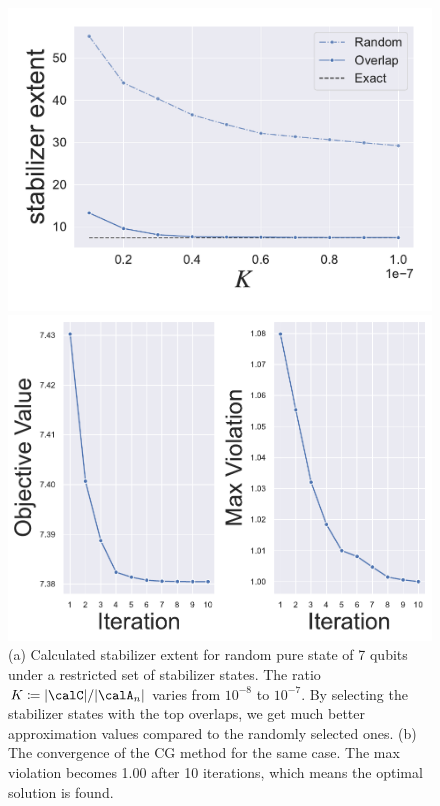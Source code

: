 \documentclass[a4paper, onecolumn, 11pt, longbibliography]{quantumarticle}
\newcommand{\defeq}{\coloneqq}
\begin{document}
\begin{figure}[t]
    \begin{minipage}{0.55\hsize}
        \centering
        \includegraphics[width=\columnwidth]{../../image/K_vs_extent_7.pdf}
        \subcaption{}
    \end{minipage}
    \begin{minipage}{0.45\hsize}
        \centering
        \includegraphics[width=\columnwidth]{../../image/CG_7.pdf}
        \subcaption{}
    \end{minipage}
    \caption{
        (a) Calculated stabilizer extent
        for random pure state of 7 qubits
        under a restricted set of stabilizer states.
        The ratio $K \defeq \abs{\calC}/\abs{\calA_n}$
        varies from $10^{-8}$ to $10^{-7}$.
        By selecting the stabilizer states with the top overlaps,
        we get much better approximation values
        compared to the randomly selected ones.
        (b) The convergence of the CG method
        for the same case.
        The max violation becomes 1.00
        after 10 iterations, which means
        the optimal solution is found.
    }
    \label{fig:CG}
\end{figure}
\end{document}
